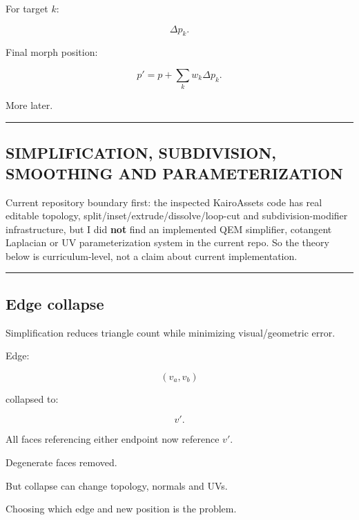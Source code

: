 For target \(k\):

\[
\Delta p_k.
\]

Final morph position:

\[
p'=p+\sum_k w_k\Delta p_k.
\]

More later.

\begin{center}\rule{0.5\linewidth}{0.5pt}\end{center}

\subsection{SIMPLIFICATION, SUBDIVISION, SMOOTHING AND PARAMETERIZATION}\label{04-visual-computing-ii-ch041-simplification-subdivision-smoothing-and-parameterization}

\hypertarget{04-visual-computing-ii-ch041-simplification-subdivision-smoothing-and-parameterization}{}

Current repository boundary first: the inspected KairoAssets code has real editable topology, split/inset/extrude/dissolve/loop-cut and subdivision-modifier infrastructure, but I did \textbf{not} find an implemented QEM simplifier, cotangent Laplacian or UV parameterization system in the current repo. So the theory below is curriculum-level, not a claim about current implementation.

\begin{center}\rule{0.5\linewidth}{0.5pt}\end{center}

\subsection{Edge collapse}\label{04-visual-computing-ii-ch041-edge-collapse}

\hypertarget{04-visual-computing-ii-ch041-edge-collapse}{}

Simplification reduces triangle count while minimizing visual/geometric error.

Edge:

\[
(v_a,v_b)
\]

collapsed to:

\[
v'.
\]

All faces referencing either endpoint now reference \(v'\).

Degenerate faces removed.

But collapse can change topology, normals and UVs.

Choosing which edge and new position is the problem.

